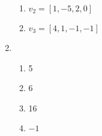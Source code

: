\documentclass{article}
\begin{document}
\begin{enumerate}
\begin{enumerate}
                \item $v_2 = [1,-5,2,0]$
                \item $v_3 = [4,1,-1,-1]$
            \end{enumerate}
        \item 
            \begin{enumerate}
                \item 5
                \item 6
                \item 16
                \item $-1$
            \end{enumerate}
    \end{enumerate}
\end{document}
